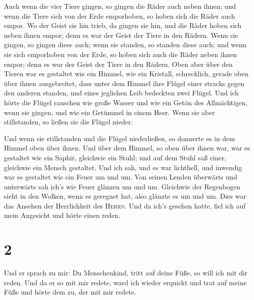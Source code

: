  Auch wenn die vier Tiere gingen, so gingen die Räder
auch neben ihnen; und wenn die Tiere sich von der Erde emporhoben, so
hoben sich die Räder auch empor.  Wo der Geist sie hin
trieb, da gingen sie hin, und die Räder hoben sich neben ihnen empor;
denn es war der Geist der Tiere in den Rädern.  Wenn sie
gingen, so gingen diese auch; wenn sie standen, so standen diese auch;
und wenn sie sich emporhoben von der Erde, so hoben sich auch die Räder
neben ihnen empor; denn es war der Geist der Tiere in den Rädern.
 Oben aber über den Tieren war es gestaltet wie ein
Himmel, wie ein Kristall, schrecklich, gerade oben über ihnen
ausgebreitet,  dass unter dem Himmel ihre Flügel einer
stracks gegen den anderen standen, und eines jeglichen Leib bedeckten
zwei Flügel.  Und ich hörte die Flügel rauschen wie große
Wasser und wie ein Getön des Allmächtigen, wenn sie gingen, und wie ein
Getümmel in einem Heer. Wenn sie aber stillstanden, so ließen sie die
Flügel nieder.

 Und wenn sie stillstanden und die Flügel niederließen,
so donnerte es in dem Himmel oben über ihnen.  Und über
dem Himmel, so oben über ihnen war, war es gestaltet wie ein Saphir,
gleichwie ein Stuhl; und auf dem Stuhl saß einer, gleichwie ein Mensch
gestaltet.  Und ich sah, und es war lichthell, und
inwendig war es gestaltet wie ein Feuer um und um. Von seinen Lenden
überwärts und unterwärts sah ich's wie Feuer glänzen um und um.
 Gleichwie der Regenbogen sieht in den Wolken, wenn es
geregnet hat, also glänzte es um und um. Dies war das Ansehen der
Herrlichkeit des \textsc{Herrn}. Und da ich's gesehen hatte, fiel ich
auf mein Angesicht und hörte einen reden.

\hypertarget{section-1}{%
\section{2}\label{section-1}}

 Und er sprach zu mir: Du Menschenkind, tritt auf deine
Füße, so will ich mit dir reden.  Und da er so mit mir
redete, ward ich wieder erquickt und trat auf meine Füße und hörte dem
zu, der mit mir redete.

